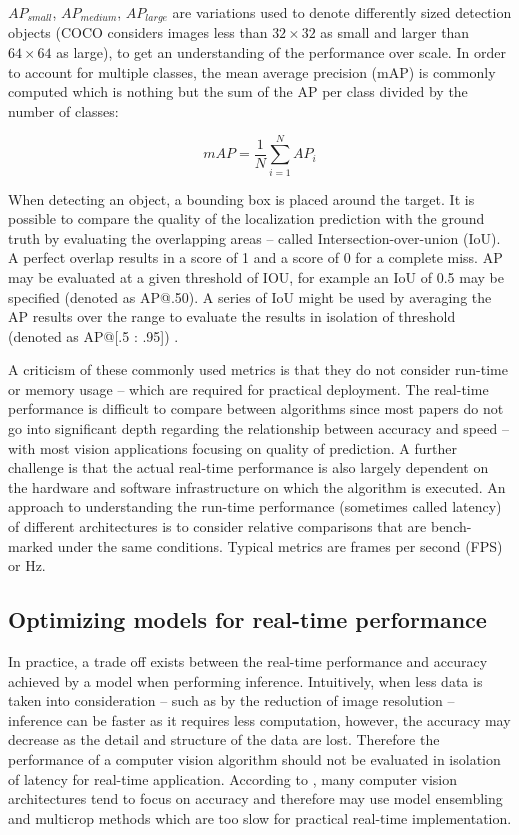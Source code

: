 \documentclass[a4paper,twoside,12pt]{report}
\begin{document}
$AP_{small}$, $AP_{medium}$, $AP_{large}$ are variations used to denote differently sized detection objects (COCO considers images less than $32 \times 32$ as small and larger than $64 \times 64$ as large), to get an understanding of the performance over scale. In order to account for multiple classes, the mean average precision (mAP) is commonly computed which is nothing but the sum of the AP per class divided by the number of classes:

\begin{equation}
mAP = \frac{1}{N}\sum_{i=1}^{N} AP_{i}
\end{equation}

When detecting an object, a bounding box is placed around the target. It is possible to compare the quality of the localization prediction with the ground truth by evaluating the overlapping areas -- called Intersection-over-union (IoU). A perfect overlap results in a score of 1 and a score of 0 for a complete miss. AP may be evaluated at a given threshold of IOU, for example an IoU of 0.5 may be specified (denoted as AP@.50). A series of IoU might be used by averaging the AP results over the range to evaluate the results in isolation of threshold (denoted as AP@[.5 : .95]) \citep{pmetrics}.

A criticism of these commonly used metrics is that they do not consider run-time or memory usage -- which are required for practical deployment. The real-time performance is difficult to compare between algorithms since most papers do not go into significant depth regarding the relationship between accuracy and speed \citep{speedacc} -- with most vision applications focusing on quality of prediction. A further challenge is that the actual real-time performance is also largely dependent on the hardware and software infrastructure on which the algorithm is executed. An approach to understanding the run-time performance (sometimes called latency) of different architectures is to consider relative comparisons that are bench-marked under the same conditions. Typical metrics are frames per second (FPS) or Hz.

\newpage
\subsection{Optimizing models for real-time performance}

In practice, a trade off exists between the real-time performance and accuracy achieved by a model when performing inference. Intuitively, when less data is taken into consideration -- such as by the reduction of image resolution -- inference can be faster as it requires less computation, however, the accuracy may decrease as the detail and structure of the data are lost. Therefore the performance of a computer vision algorithm should not be evaluated in isolation of latency for real-time application. According to \cite{speedacc}, many computer vision architectures tend to focus on accuracy and therefore may use model ensembling and multicrop methods which are too slow for practical real-time implementation.
\end{document}
